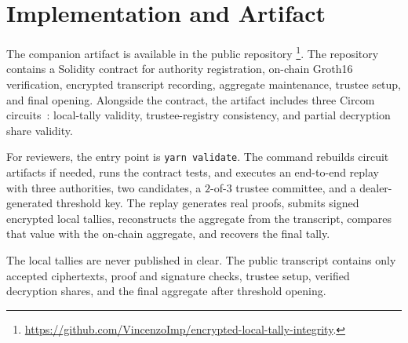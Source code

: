 
\section{Implementation and Artifact}

The companion artifact is available in the public repository%
\footnote{\url{https://github.com/VincenzoImp/encrypted-local-tally-integrity}.}.
The repository contains a Solidity contract for authority registration,
on-chain Groth16 verification, encrypted transcript recording, aggregate
maintenance, trustee setup, and final opening. Alongside the contract, the
artifact includes three Circom circuits~\cite{circom}: local-tally validity,
trustee-registry consistency, and partial decryption share validity.

For reviewers, the entry point is \texttt{yarn validate}. The command rebuilds
circuit artifacts if needed, runs the contract tests, and executes an
end-to-end replay with three authorities, two candidates, a $2$-of-$3$ trustee
committee, and a dealer-generated threshold key. The replay generates real
proofs, submits signed encrypted local tallies, reconstructs the aggregate from
the transcript, compares that value with the on-chain aggregate, and recovers
the final tally.

The local tallies are never published in clear. The public transcript contains
only accepted ciphertexts, proof and signature checks, trustee setup,
verified decryption shares, and the final aggregate after threshold opening.
